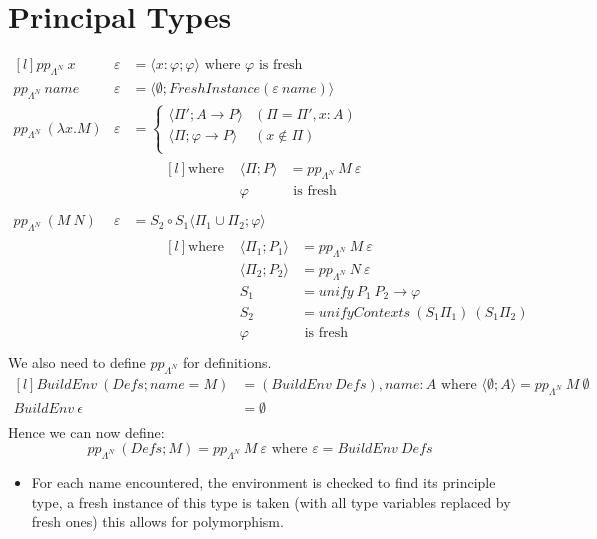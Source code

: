 \section{Principal Types}
\[\begin{matrix*}[l]
    pp_{\Lambda^N} \ x & \varepsilon & = \langle x: \varphi ; \varphi \rangle \text{ where } \varphi \text{ is fresh} \\
    pp_{\Lambda^N} \ name & \varepsilon & = \langle \emptyset ; FreshInstance(\varepsilon \ name) \rangle \\
    pp_{\Lambda^N} \ (\lambda x . M) & \varepsilon & = \begin{cases}
        \langle \Pi'; A \to P \rangle & (\Pi = \Pi', x:A) \\
        \langle \Pi; \varphi \to P \rangle & (x \not\in \Pi) \\
    \end{cases} \\
    & & \qquad \begin{matrix*}[l]
        \text{where } & \langle \Pi; P \rangle & = pp_{\Lambda^N} \ M \ \varepsilon \\
        & \varphi & \text{ is fresh} \\
    \end{matrix*} \\
    pp_{\Lambda^N} \ (M \ N) & \varepsilon & = S_2 \circ S_1 \langle \Pi_1 \cup \Pi_2 ; \varphi \rangle \\
    & & \qquad \begin{matrix*}[l]
        \text{where } & \langle \Pi_1 ; P_1 \rangle & = pp_{\Lambda^N} \ M \ \varepsilon \\
        & \langle \Pi_2 ; P_2 \rangle & = pp_{\Lambda^N} \ N \ \varepsilon \\
        & S_1 & = unify \ P_1 \ P_2 \to \varphi \\
        & S_2 & = unifyContexts \ (S_1 \Pi_1) \ (S_1 \Pi_2) \\
        & \varphi & \text{ is fresh} \\
    \end{matrix*}
\end{matrix*}\]
We also need to define $pp_{\Lambda^N}$ for definitions.
\[\begin{matrix*}[l]
    BuildEnv \ (Defs ; name = M) & = (BuildEnv \ Defs), name:A \text{ where } \langle \emptyset; A \rangle = pp_{\Lambda^N} \ M \ \emptyset \\
    BuildEnv \ \epsilon & = \emptyset \\
\end{matrix*}\]
Hence we can now define:
\[pp_{\Lambda^N} \ (Defs; M) = pp_{\Lambda^N} \ M \ \varepsilon \text{ where } \varepsilon = BuildEnv \ Defs\]
\begin{itemize}
    \item For each name encountered, the environment is checked to find its principle type, a fresh instance of this type is taken (with all type variables replaced by fresh ones) this allows for polymorphism.
\end{itemize}

